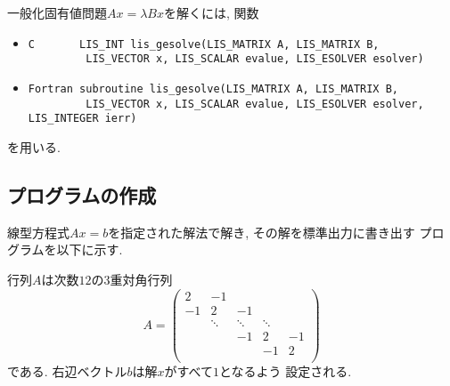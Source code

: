 \documentclass[a4paper]{jarticle}
\begin{document}
{{一般化固有値問題$Ax=\lambda Bx$を解くには, 関数
\begin{itemize}
\item \verb|C       LIS_INT lis_gesolve(LIS_MATRIX A, LIS_MATRIX B,|\\
      \verb|         LIS_VECTOR x, LIS_SCALAR evalue, LIS_ESOLVER esolver)|
\item \verb|Fortran subroutine lis_gesolve(LIS_MATRIX A, LIS_MATRIX B,|\\
      \verb|         LIS_VECTOR x, LIS_SCALAR evalue, LIS_ESOLVER esolver, LIS_INTEGER ierr)|
\end{itemize}
を用いる. 

\subsection{プログラムの作成}
\label{sec:testprog3}
線型方程式$Ax=b$を指定された解法で解き, その解を標準出力に書き出す
プログラムを以下に示す. 

行列$A$は次数$12$の3重対角行列
\[
A = 
\left(
\begin{array}{ccccc}
2 & -1 &   &  &   \\
-1 & 2 & -1 &  &   \\
  & \ddots  & \ddots  & \ddots  &   \\
  &   & -1 & 2 & -1 \\
  &   &   & -1 & 2 \\
\end{array}
\right)
\]
である. 右辺ベクトル$b$は解$x$がすべて$1$となるよう
設定される. 

}}
\end{document}

